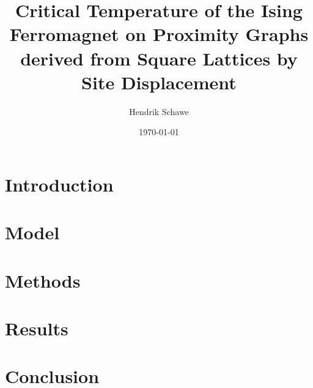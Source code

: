 \documentclass[prl,twocolumn,groupedaddress,showpacs,showkeys,amsmath,amssymb,floatfix]{revtex4-1}
\begin{document}
    \title{Critical Temperature of the Ising Ferromagnet on Proximity Graphs derived from Square Lattices by Site Displacement}
    \author{Hendrik Schawe}
    \date{\today}

    \begin{abstract}
    
    \end{abstract}

    \maketitle

    \section{Introduction}
        

    \section{Model}
        

    \section{Methods}
        

    \section{Results}
        

    \section{Conclusion}
        

    

    
\end{document}
